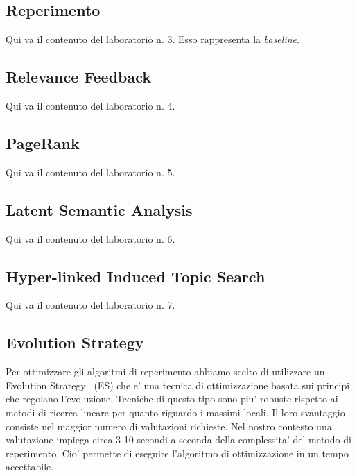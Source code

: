 \subsection{Reperimento}
\label{sec:metodi-di-reper}

Qui va il contenuto del laboratorio n. 3. Esso rappresenta la \textit{baseline}.

\subsection{Relevance Feedback}
\label{sec:relevance-feedback}

Qui va il contenuto del laboratorio n. 4.

\subsection{PageRank}
\label{sec:pagerank}

Qui va il contenuto del laboratorio n. 5.

\subsection{Latent Semantic Analysis}
\label{sec:lsa}

Qui va il contenuto del laboratorio n. 6.

\subsection{Hyper-linked Induced Topic Search}
\label{sec:hits}

Qui va il contenuto del laboratorio n. 7.

\subsection{Evolution Strategy}
\label{sec:es}

Per ottimizzare gli algoritmi di reperimento abbiamo scelto di utilizzare un Evolution Strategy~\cite{back1996evolutionary} (ES) che e' una tecnica di ottimizzazione basata sui principi che regolano l'evoluzione. Tecniche di questo tipo sono piu' robuste rispetto ai metodi di ricerca lineare per quanto riguardo i massimi locali. Il loro svantaggio consiste nel maggior numero di valutazioni richieste. Nel nostro contesto una valutazione impiega circa 3-10 secondi a seconda della complessita' del metodo di reperimento. Cio' permette di eseguire l'algoritmo di ottimizzazione in un tempo accettabile.

